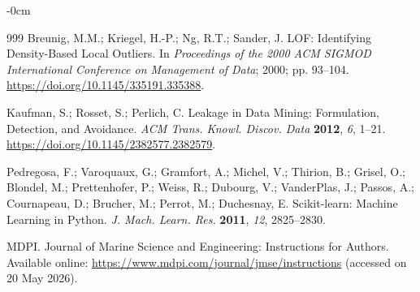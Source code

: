 \documentclass[jmse,article,submit,pdftex,oneauthor]{Definitions/mdpi}
\begin{document}
\begin{adjustwidth}{-\extralength}{0cm}
\begin{thebibliography}{999}
Breunig, M.M.; Kriegel, H.-P.; Ng, R.T.; Sander, J. LOF: Identifying Density-Based Local Outliers. In \textit{Proceedings of the 2000 ACM SIGMOD International Conference on Management of Data}; 2000; pp. 93--104. \url{https://doi.org/10.1145/335191.335388}.

Kaufman, S.; Rosset, S.; Perlich, C. Leakage in Data Mining: Formulation, Detection, and Avoidance. \textit{ACM Trans. Knowl. Discov. Data} \textbf{2012}, \textit{6}, 1--21. \url{https://doi.org/10.1145/2382577.2382579}.

Pedregosa, F.; Varoquaux, G.; Gramfort, A.; Michel, V.; Thirion, B.; Grisel, O.; Blondel, M.; Prettenhofer, P.; Weiss, R.; Dubourg, V.; VanderPlas, J.; Passos, A.; Cournapeau, D.; Brucher, M.; Perrot, M.; Duchesnay, E. Scikit-learn: Machine Learning in Python. \textit{J. Mach. Learn. Res.} \textbf{2011}, \textit{12}, 2825--2830.

MDPI. Journal of Marine Science and Engineering: Instructions for Authors. Available online: \url{https://www.mdpi.com/journal/jmse/instructions} (accessed on 20 May 2026).

\end{thebibliography}

\PublishersNote{}
\end{adjustwidth}
\end{document}
